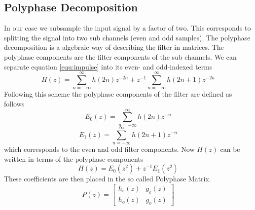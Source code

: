 \begin{refsection}

\subsection{Polyphase Decomposition \label{fpga:polyphase}}

In our case we subsample the input signal by a factor of two. This corresponds to splitting the signal into two sub channels (even and odd samples). The polyphase decomposition is a algebraic way of describing the filter in matrices. The polyphase components are the filter components of the sub channels. 
We can separate equation \ref{equ:impulse} into its even- and odd-indexed terms
\begin{equation}
	H(z) = \sum_{n=-\infty}^{\infty} h(2n)z^{-2n} + z^{-1} \sum_{n=-\infty}^{\infty} h(2n+1)z^{-2n}
\end{equation}
Following this scheme the polyphase components of the filter are defined as follows
\begin{equation}
E_0(z) = \sum_{n=-\infty}^{\infty} h(2n)z^{-n}
\end{equation}
\begin{equation}
E_1(z) = \sum_{n=-\infty}^{\infty} h(2n+1)z^{-n}
\end{equation}
which corresponds to the even and odd filter components.
Now $H(z)$ can be written in terms of the polyphase components
\begin{equation}
H(z)=E_{0}(z^2)+z^{-1} E_1(z^2)
\end{equation}
These coefficients are then placed in the so called Polyphase Matrix.
\begin{equation}
	P(z) = 
	\begin{bmatrix}
	h_e(z) & g_e(z) \\
	h_o(z) & g_o(z)
	\end{bmatrix}
\end{equation}


\end{refsection}
